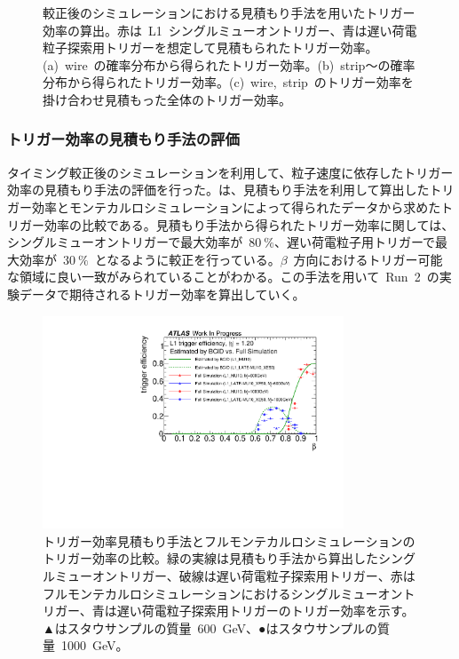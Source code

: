 \begin{figure}[H]
\begin{minipage}{0.99\hsize}
    \subcaption{}
    \end{minipage}
    \caption[較正後のシミュレーションにおける見積もり手法を用いたトリガー効率の算出]{較正後のシミュレーションにおける見積もり手法を用いたトリガー効率の算出。赤は~L1~シングルミューオントリガー、青は遅い荷電粒子探索用トリガーを想定して見積もられたトリガー効率。(a)~wire~の確率分布から得られたトリガー効率。(b)~strip～の確率分布から得られたトリガー効率。(c)~wire,~strip~のトリガー効率を掛け合わせ見積もった全体のトリガー効率。}\label{fig:efftune}
\end{figure}


\subsubsection{トリガー効率の見積もり手法の評価}\label{chap:caltri}
タイミング較正後のシミュレーションを利用して、粒子速度に依存したトリガー効率の見積もり手法の評価を行った。は、見積もり手法を利用して算出したトリガー効率とモンテカルロシミュレーションによって得られたデータから求めたトリガー効率の比較である。見積もり手法から得られたトリガー効率に関しては、シングルミューオントリガーで最大効率が~$80~\%$、遅い荷電粒子用トリガーで最大効率が~$30~\%$~となるように較正を行っている。$\beta$~方向におけるトリガー可能な領域に良い一致がみられていることがわかる。この手法を用いて~Run~2~の実験データで期待されるトリガー効率を算出していく。

\begin{figure}[H]
    \centering   
    \includegraphics[width=0.8\textwidth,page=1]{img/rec/vs.pdf}
    \caption[トリガー効率見積もり手法とフルモンテカルロシミュレーションのトリガー効率の比較]{トリガー効率見積もり手法とフルモンテカルロシミュレーションのトリガー効率の比較。緑の実線は見積もり手法から算出したシングルミューオントリガー、破線は遅い荷電粒子探索用トリガー、赤はフルモンテカルロシミュレーションにおけるシングルミューオントリガー、青は遅い荷電粒子探索用トリガーのトリガー効率を示す。▲はスタウサンプルの質量~600~GeV、●はスタウサンプルの質量~1000~GeV。}\label{fig:comp}
\end{figure}

